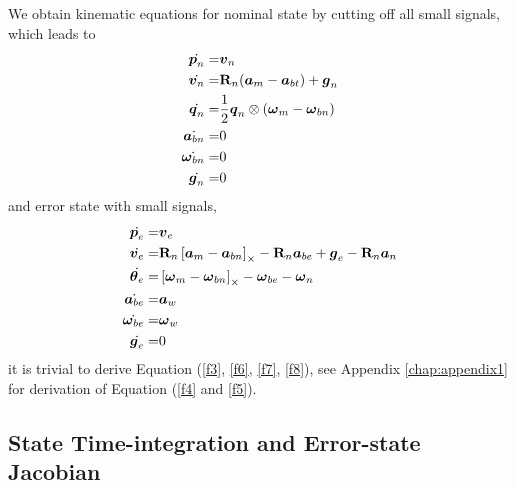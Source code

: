 We obtain kinematic equations for nominal state by cutting off all small signals, which leads to
\begin{align}
	\label{f12}
	\dot{\boldsymbol{p}_n} =& \boldsymbol{v}_n \\
	\label{f11}
	\dot{\boldsymbol{v}_n} =& \mathbf{R}_n(\boldsymbol{a}_m - \boldsymbol{a}_{bt}) + \boldsymbol{g}_n\\
	\dot{\boldsymbol{q}_n} =& \frac{1}{2}\boldsymbol{q}_n \otimes (\boldsymbol{\omega}_m - \boldsymbol{\omega}_{bn})\\
	\dot{\boldsymbol{a}_{bn}} =& 0 \\
	\dot{\boldsymbol{\omega}_{bn}} =& 0 \\ 
	\label{f13}
	\dot{\boldsymbol{g}_n} =& 0 
\end{align}
and error state with small signals,
\begin{align}
	\label{f3}
	\dot{\boldsymbol{p}_e} =& \boldsymbol{v}_e \\
	\label{f4}
	\dot{\boldsymbol{v}_e} =& \mathbf{R}_n \left[ \boldsymbol{a}_m - \boldsymbol{a}_{bn} \right]_{\times} -  \mathbf{R}_n\boldsymbol{a}_{be} + \boldsymbol{g}_e - \mathbf{R}_n\boldsymbol{a}_n\\
	\label{f5}
	\dot{\boldsymbol{\theta}_e} =& \left[ \boldsymbol{\omega}_m - \boldsymbol{\omega}_{bn} \right]_{\times} - \boldsymbol{\omega}_{be} - \boldsymbol{\omega}_{n}\\
	\label{f6}
	\dot{\boldsymbol{a}_{be}} =& \boldsymbol{a}_w \\
	\label{f7}
	\dot{\boldsymbol{\omega}_{be}} =& \boldsymbol{\omega}_{w} \\ 
	\label{f8}
	\dot{\boldsymbol{g}_e} =& 0 
\end{align}
it is trivial to derive Equation (\ref{f3}, \ref{f6}, \ref{f7}, \ref{f8}), see Appendix \ref{chap:appendix1} for derivation of Equation (\ref{f4} and \ref{f5}).

\subsection{State Time-integration and Error-state Jacobian}
\label{subsec:ESKF_IMU_sub3}

